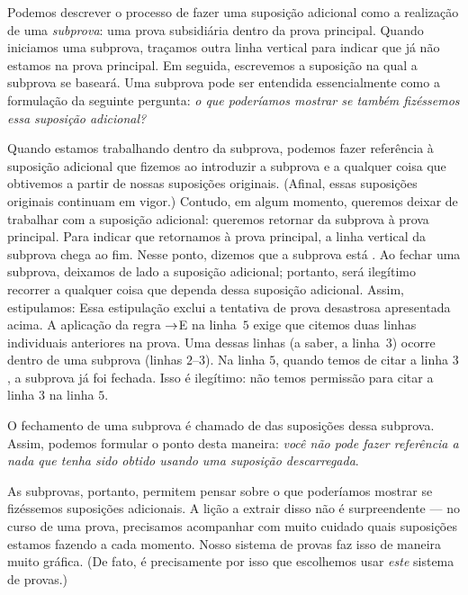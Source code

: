 Podemos descrever o processo de fazer uma suposição adicional como a realização de uma \emph{subprova}: uma prova subsidiária dentro da prova principal. Quando iniciamos uma subprova, traçamos outra linha vertical para indicar que já não estamos na prova principal. Em seguida, escrevemos a suposição na qual a subprova se baseará. Uma subprova pode ser entendida essencialmente como a formulação da seguinte pergunta: \emph{o que poderíamos mostrar se também fizéssemos essa suposição adicional?}

Quando estamos trabalhando dentro da subprova, podemos fazer referência à suposição adicional que fizemos ao introduzir a subprova e a qualquer coisa que obtivemos a partir de nossas suposições originais. (Afinal, essas suposições originais continuam em vigor.) Contudo, em algum momento, queremos deixar de trabalhar com a suposição adicional: queremos retornar da subprova à prova principal. Para indicar que retornamos à prova principal, a linha vertical da subprova chega ao fim. Nesse ponto, dizemos que a subprova está . Ao fechar uma subprova, deixamos de lado a suposição adicional; portanto, será ilegítimo recorrer a qualquer coisa que dependa dessa suposição adicional. Assim, estipulamos:
Essa estipulação exclui a tentativa de prova desastrosa apresentada acima. A aplicação da regra $\rightarrow$E na linha~$5$ exige que citemos duas linhas individuais anteriores na prova. Uma dessas linhas (a saber, a linha~$3$) ocorre dentro de uma subprova (linhas $2$--$3$). Na linha $5$, quando temos de citar a linha $3$, a subprova já foi fechada. Isso é ilegítimo: não temos permissão para citar a linha $3$ na linha $5$.

O fechamento de uma subprova é chamado de  das suposições
dessa subprova. Assim, podemos formular o ponto desta maneira: \emph{você não pode
fazer referência a nada que tenha sido obtido usando uma suposição descarregada}.

As subprovas, portanto, permitem pensar sobre o que poderíamos mostrar se fizéssemos suposições adicionais. A lição a extrair disso não é surpreendente — no curso de uma prova, precisamos acompanhar com muito cuidado quais suposições estamos fazendo a cada momento. Nosso sistema de provas faz isso de maneira muito gráfica. (De fato, é precisamente por isso que escolhemos usar \emph{este} sistema de provas.)

